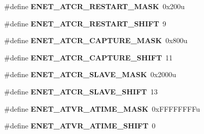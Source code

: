 \begin{DoxyCompactItemize}
\item 
\hypertarget{group___e_n_e_t___register___masks_ga3a0c41e65b6be0a4ecf7952cd4ba33a9}{}\#define {\bfseries E\+N\+E\+T\+\_\+\+A\+T\+C\+R\+\_\+\+R\+E\+S\+T\+A\+R\+T\+\_\+\+M\+A\+S\+K}~0x200u\label{group___e_n_e_t___register___masks_ga3a0c41e65b6be0a4ecf7952cd4ba33a9}

\item 
\hypertarget{group___e_n_e_t___register___masks_ga5920e6dc52564ba30bf8426b5cc14071}{}\#define {\bfseries E\+N\+E\+T\+\_\+\+A\+T\+C\+R\+\_\+\+R\+E\+S\+T\+A\+R\+T\+\_\+\+S\+H\+I\+F\+T}~9\label{group___e_n_e_t___register___masks_ga5920e6dc52564ba30bf8426b5cc14071}

\item 
\hypertarget{group___e_n_e_t___register___masks_gacd8fe80e2e9c0c195beaf224632d0e65}{}\#define {\bfseries E\+N\+E\+T\+\_\+\+A\+T\+C\+R\+\_\+\+C\+A\+P\+T\+U\+R\+E\+\_\+\+M\+A\+S\+K}~0x800u\label{group___e_n_e_t___register___masks_gacd8fe80e2e9c0c195beaf224632d0e65}

\item 
\hypertarget{group___e_n_e_t___register___masks_gad427aa0f3d7b6595aaf79996904fe1ff}{}\#define {\bfseries E\+N\+E\+T\+\_\+\+A\+T\+C\+R\+\_\+\+C\+A\+P\+T\+U\+R\+E\+\_\+\+S\+H\+I\+F\+T}~11\label{group___e_n_e_t___register___masks_gad427aa0f3d7b6595aaf79996904fe1ff}

\item 
\hypertarget{group___e_n_e_t___register___masks_ga183333c88147503540c9c79d092d5799}{}\#define {\bfseries E\+N\+E\+T\+\_\+\+A\+T\+C\+R\+\_\+\+S\+L\+A\+V\+E\+\_\+\+M\+A\+S\+K}~0x2000u\label{group___e_n_e_t___register___masks_ga183333c88147503540c9c79d092d5799}

\item 
\hypertarget{group___e_n_e_t___register___masks_gac12640c8f8383b91eafd801f7d13f218}{}\#define {\bfseries E\+N\+E\+T\+\_\+\+A\+T\+C\+R\+\_\+\+S\+L\+A\+V\+E\+\_\+\+S\+H\+I\+F\+T}~13\label{group___e_n_e_t___register___masks_gac12640c8f8383b91eafd801f7d13f218}

\item 
\hypertarget{group___e_n_e_t___register___masks_ga2714eeb8f8fc55584ae1f08903279268}{}\#define {\bfseries E\+N\+E\+T\+\_\+\+A\+T\+V\+R\+\_\+\+A\+T\+I\+M\+E\+\_\+\+M\+A\+S\+K}~0x\+F\+F\+F\+F\+F\+F\+F\+Fu\label{group___e_n_e_t___register___masks_ga2714eeb8f8fc55584ae1f08903279268}

\item 
\hypertarget{group___e_n_e_t___register___masks_gaf39338513eb4396791bd615bac83c136}{}\#define {\bfseries E\+N\+E\+T\+\_\+\+A\+T\+V\+R\+\_\+\+A\+T\+I\+M\+E\+\_\+\+S\+H\+I\+F\+T}~0\label{group___e_n_e_t___register___masks_gaf39338513eb4396791bd615bac83c136}


\end{DoxyCompactItemize}
